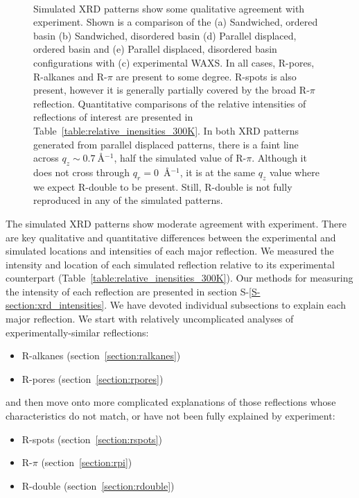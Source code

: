 \documentclass[journal=jpcbfk,manuscript=article]{achemso}
\begin{document}
\begin{figure}[!htb]
\begin{subfigure}{0.1\textwidth}
	\end{subfigure}	
	\caption{Simulated XRD patterns show some qualitative agreement with experiment. Shown is a 
	comparison of the (a) Sandwiched, ordered basin (b) Sandwiched,
	disordered basin (d) Parallel displaced, ordered basin and (e) Parallel displaced, disordered basin 
	configurations with (c) experimental WAXS. 	In all cases, R-pores, R-alkanes and R-$\pi$ are 
	present to some degree. R-spots is also present, however it is generally partially covered by the
	broad R-$\pi$ reflection. Quantitative comparisons of the relative intensities of reflections of
	interest are presented in Table~\ref{table:relative_inensities_300K}. In both XRD patterns generated
	from parallel displaced patterns, there is a faint line across $q_z \sim 0.7~$\AA$^{-1}$, half
	the simulated value of R-$\pi$. Although it does not cross through $q_r = 0$~\AA$^{-1}$, it is at 
	the same $q_z$ value where we expect R-double to be present. Still, R-double is not fully reproduced
	in any of the simulated patterns.}~\label{fig:XRDsim} 
  \end{figure}
  
  The simulated XRD patterns show moderate agreement with experiment. There 
  are key qualitative and quantitative differences between the experimental and simulated
  locations and intensities of each major reflection. We measured the intensity and location
   of each simulated reflection relative to its experimental counterpart 
  (Table~\ref{table:relative_inensities_300K}). Our methods for measuring the intensity of
  each reflection are presented in section S-\ref{S-section:xrd_intensities}. We have
  devoted individual subsections to explain each major reflection. We start with relatively 
  uncomplicated analyses of experimentally-similar reflections:
  \begin{itemize}
  	\item R-alkanes (section~\ref{section:ralkanes})
  	\item R-pores (section~\ref{section:rpores})
  \end{itemize}
  and then move onto more complicated explanations of those reflections whose characteristics
  do not match, or have not been fully explained by experiment:
  \begin{itemize}
  	\item R-spots (section~\ref{section:rspots})
  	\item R-$\pi$ (section~\ref{section:rpi})
  	\item R-double (section~\ref{section:rdouble})
  \end{itemize}
  
\end{document}
